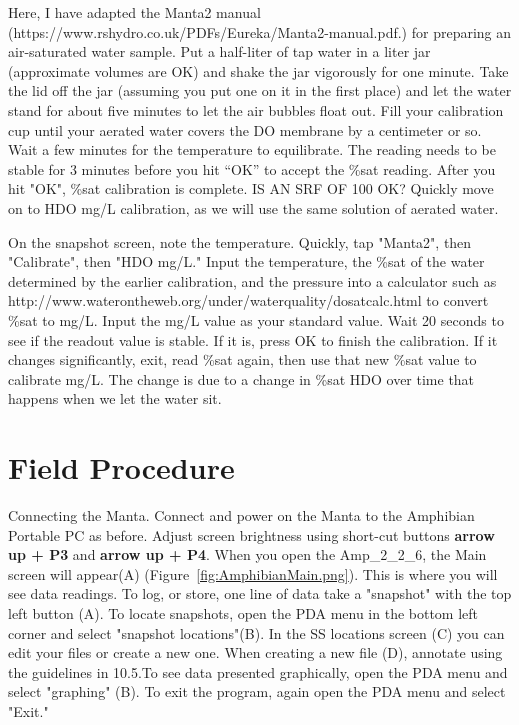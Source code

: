 \documentclass[12pt]{../SOP3}\usepackage[]{graphicx}\usepackage[]{color}
\begin{document}
\NP Here, I have adapted the Manta2 manual (https://www.rshydro.co.uk/PDFs/Eureka/Manta2-manual.pdf.) for preparing an air-saturated water sample. Put a half-liter of tap water in a liter jar (approximate volumes are OK) and shake the jar vigorously for one minute. Take the lid off the jar (assuming you put one on it in the first place) and let the water stand for about five minutes to let the air bubbles float out. Fill your calibration cup until your aerated water covers the DO membrane by a centimeter or so. Wait a few minutes for the temperature to equilibrate. The reading needs to be stable for 3 minutes before you hit “OK” to accept the \%sat reading. After you hit "OK", \%sat calibration is complete. IS AN SRF OF 100 OK? Quickly move on to HDO mg/L calibration, as we will use the same solution of aerated water. 

\NP On the snapshot screen, note the temperature. Quickly, tap "Manta2", then "Calibrate", then "HDO mg/L." Input the temperature, the \%sat of the water determined by the earlier calibration, and the pressure into a calculator such as http://www.waterontheweb.org/under/waterquality/dosatcalc.html to convert \%sat to mg/L. Input the mg/L value as your standard value. Wait 20 seconds to see if the readout value is stable. If it is, press OK to finish the calibration. If it changes significantly, exit, read \%sat again, then use that new \%sat value to calibrate mg/L. The change is due to a change in \%sat HDO over time that happens when we let the water sit. 

\section{Field Procedure}

\NP Connecting the Manta. Connect and power on the Manta to the Amphibian Portable PC as before. Adjust screen brightness using short-cut buttons \textbf{arrow up + P3} and \textbf{arrow up + P4}. When you open the Amp\_2\_2\_6, the Main screen will appear(A) (Figure~\ref{fig:AmphibianMain.png}). This is where you will see data readings. To log, or store, one line of data take a "snapshot" with the top left button (A). To locate snapshots, open the PDA menu in the bottom left corner and select "snapshot locations"(B). In the SS locations screen (C) you can edit your files or create a new one. When creating a new file (D), annotate using the guidelines in 10.5.To see data presented graphically, open the PDA menu and select "graphing" (B). To exit the program, again open the PDA menu and select "Exit."
\end{document}
